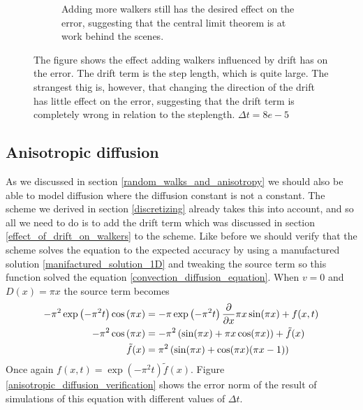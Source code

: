 \begin{figure}[H]
\begin{subfigure}[b]{0.48\textwidth}
\caption{Adding more walkers still has the desired effect on the error, suggesting that the central limit theorem is at work behind the scenes.}
\label{Errortest_convection_diffusion_walkers:more_walkers}
\end{subfigure}
\caption[Adding walkers influenced by drift]{The figure shows the effect adding walkers influenced by drift has on the error. 
The drift term is the step length, which is quite large. The strangest thig is, however, that changing the direction of the drift has little effect on the error, suggesting that the drift term is completely wrong in relation to the steplength. $\Delta t =8e-5$}
\label{Errortest_convection_diffusion_walkers}
\end{figure}



\subsection{Anisotropic diffusion}

As we discussed in section \ref{random_walks_and_anisotropy} we should also be able to model diffusion where the diffusion constant is not a constant. 
The scheme we derived in section \ref{discretizing} already takes this into account, and so all we need to do is to add the drift term which was discussed in section \ref{effect_of_drift_on_walkers} to the scheme. 
Like before we should verify that the scheme solves the equation to the expected accuracy by using a manufactured solution \ref{manifactured_solution_1D} and tweaking the source term so this function solved the equation \ref{convection_diffusion_equation}. 
When $v=0$ and $D(x) = \pi x$ the source term becomes
\begin{align*}
 -\pi^2\exp\left(-\pi^2t\right)\cos\left(\pi x\right) &= -\pi\exp\left(-\pi^2t\right)\frac{\partial}{\partial x}\pi x\sin(\pi x) +f(x,t) \\
 -\pi^2\cos\left(\pi x\right) &= -\pi^2\left(\sin(\pi x) + \pi x\cos(\pi x)\right) +\tilde{f}(x) \\
 \tilde{f}(x) &= \pi^2\left(\sin(\pi x) +\cos(\pi x)(\pi x-1)\right)
\end{align*}
Once again $f(x,t) = \exp\left(-\pi^2t\right)\tilde{f}(x)$. Figure \ref{anisotropic_diffusion_verification} shows the error norm of the result of simulations of this equation with different values of $\Delta t$.

